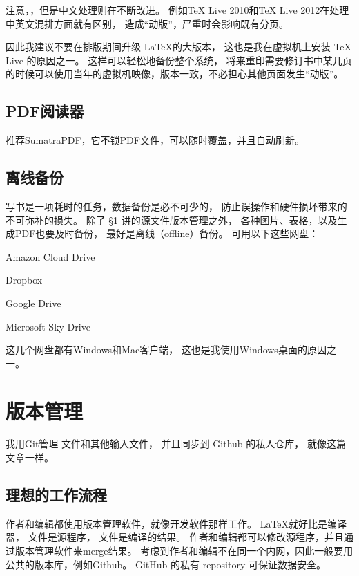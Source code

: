 注意，，但是中文处理则在不断改进。
例如TeX Live 2010和TeX Live 2012在处理中英文混排方面就有区别，
造成“动版”，严重时会影响既有分页。

\vspace{1ex}
\centerline{}

\vspace{1ex}
\centerline{}

\vspace{1ex}
因此我建议不要在排版期间升级 \LaTeX 的大版本，
这也是我在虚拟机上安装 TeX Live 的原因之一。
这样可以轻松地备份整个系统，
将来重印需要修订书中某几页的时候可以使用当年的虚拟机映像，版本一致，不必担心其他页面发生“动版”。

\subsection{PDF阅读器}
推荐SumatraPDF，它不锁PDF文件，可以随时覆盖，并且自动刷新。

\subsection{离线备份}
写书是一项耗时的任务，数据备份是必不可少的，
防止误操作和硬件损坏带来的不可弥补的损失。
除了 \S \ref{sec:versionControl} 讲的源文件版本管理之外，
各种图片、表格，以及生成PDF也要及时备份，
最好是离线（offline）备份。
可用以下这些网盘：

\begindot
\item Amazon Cloud Drive
\item Dropbox
\item Google Drive
\item Microsoft Sky Drive
\myenddot

这几个网盘都有Windows和Mac客户端，
这也是我使用Windows桌面的原因之一。

\section{版本管理}
\label{sec:versionControl}


我用Git管理  文件和其他输入文件，
并且同步到 Github 的私人仓库，
就像这篇文章一样。

\subsection{理想的工作流程}
作者和编辑都使用版本管理软件，就像开发软件那样工作。
\LaTeX 就好比是编译器，
 文件是源程序，
 文件是编译的结果。
作者和编辑都可以修改源程序，并且通过版本管理软件来merge结果。
考虑到作者和编辑不在同一个内网，因此一般要用公共的版本库，例如Github。
GitHub 的私有 repository 可保证数据安全。

